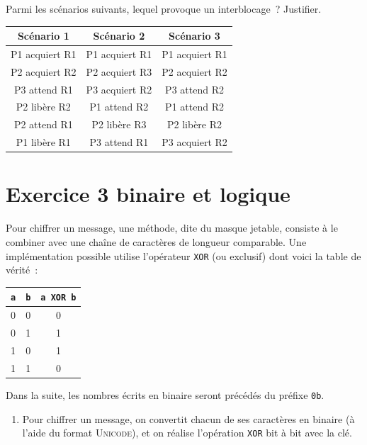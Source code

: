 \documentclass[a4paper,12pt,french]{book}
\begin{document}
\begin{enumerate}[\bfseries 1.]
    Parmi les scénarios suivants, lequel provoque un interblocage ? Justifier.
    \begin{center}
    	\begin{tabular}{|c|c|c|}
                \hline
                \rowcolor{UGLiOrange} \textbf{\color{white}Scénario 1 }& \textbf{\color{white}Scénario 2} & \textbf{\color{white}Scénario 3}  \\
                \hline
                P1 acquiert R1 & P1 acquiert R1 & P1 acquiert R1 \\
                \hline
                P2 acquiert R2& P2 acquiert R3 & P2 acquiert R2  \\
                \hline
                P3 attend R1& P3 acquiert R2 & P3 attend R2   \\
                \hline
                P2 libère R2& P1 attend R2 & P1 attend R2   \\
                                \hline
                P2 attend R1& P2 libère R3 & P2 libère R2   \\
                                \hline
                P1 libère R1& P3 attend  R1 & P3 acquiert R2   \\
                                \hline
                \end{tabular}
                \end{center}

\section*{Exercice 3 \small{\hfill binaire et logique}}
     Pour chiffrer un message, une méthode, dite du masque jetable, consiste à le combiner avec une chaîne de caractères de longueur comparable.
     Une implémentation possible utilise l’opérateur \texttt{XOR} (ou exclusif) dont voici la table de vérité :
    \begin{center}
    	\begin{tabular}{|c|c|c|}
                \hline
                \rowcolor{UGLiOrange} \textbf{\color{white}\texttt{a} }& \textbf{\color{white}\texttt{b}} & \textbf{\color{white}\texttt{a XOR b} }  \\
                \hline
                0 & 0 & 0 \\
                \hline
                0 & 1 & 1 \\
                \hline
                1 & 0 & 1 \\
                \hline
                1 & 1 & 0 \\
                \hline
                \end{tabular}
                \end{center}
   	Dans la suite, les nombres écrits en binaire seront précédés du préfixe \texttt{0b}.
       \begin{enumerate}[\bfseries 1.]
       	\item Pour chiffrer un message, on convertit chacun de ses caractères en binaire (à l’aide du format \textsc{Unicode}), et on réalise l’opération \texttt{XOR} bit à bit avec la clé.\\


\end{enumerate}
\end{enumerate}
\end{document}
